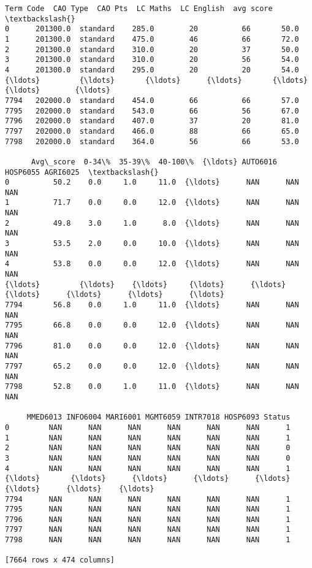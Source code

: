 \documentclass[11pt]{article}
\makeatletter
\newcommand{\boxspacing}{\kern\kvtcb@left@rule\kern\kvtcb@boxsep}
\newcommand{\prompt}[4]{
        \ttfamily\llap{{\color{#2}[#3]:\hspace{3pt}#4}}\vspace{-\baselineskip}
    }
\makeatother
\begin{document}
            \begin{tcolorbox}[breakable, size=fbox, boxrule=.5pt, pad at break*=1mm, opacityfill=0]
\prompt{Out}{outcolor}{22}{\boxspacing}
\begin{Verbatim}[commandchars=\\\{\}]
      Term Code  CAO Type  CAO Pts  LC Maths  LC English  avg score  \textbackslash{}
0      201300.0  standard    285.0        20          66       50.0
1      201300.0  standard    475.0        46          66       72.0
2      201300.0  standard    310.0        20          37       50.0
3      201300.0  standard    310.0        20          56       54.0
4      201300.0  standard    295.0        20          20       54.0
{\ldots}         {\ldots}       {\ldots}      {\ldots}       {\ldots}         {\ldots}        {\ldots}
7794   202000.0  standard    454.0        66          66       57.0
7795   202000.0  standard    543.0        66          56       67.0
7796   202000.0  standard    407.0        37          20       81.0
7797   202000.0  standard    466.0        88          66       65.0
7798   202000.0  standard    364.0        56          66       53.0

      Avg\_score  0-34\%  35-39\%  40-100\%  {\ldots} AUTO6016 HOSP6055 AGRI6025  \textbackslash{}
0          50.2    0.0     1.0     11.0  {\ldots}      NAN      NAN      NAN
1          71.7    0.0     0.0     12.0  {\ldots}      NAN      NAN      NAN
2          49.8    3.0     1.0      8.0  {\ldots}      NAN      NAN      NAN
3          53.5    2.0     0.0     10.0  {\ldots}      NAN      NAN      NAN
4          53.8    0.0     0.0     12.0  {\ldots}      NAN      NAN      NAN
{\ldots}         {\ldots}    {\ldots}     {\ldots}      {\ldots}  {\ldots}      {\ldots}      {\ldots}      {\ldots}
7794       56.8    0.0     1.0     11.0  {\ldots}      NAN      NAN      NAN
7795       66.8    0.0     0.0     12.0  {\ldots}      NAN      NAN      NAN
7796       81.0    0.0     0.0     12.0  {\ldots}      NAN      NAN      NAN
7797       65.2    0.0     0.0     12.0  {\ldots}      NAN      NAN      NAN
7798       52.8    0.0     1.0     11.0  {\ldots}      NAN      NAN      NAN

     MMED6013 INFO6004 MARI6001 MGMT6059 INTR7018 HOSP6093 Status
0         NAN      NAN      NAN      NAN      NAN      NAN      1
1         NAN      NAN      NAN      NAN      NAN      NAN      1
2         NAN      NAN      NAN      NAN      NAN      NAN      0
3         NAN      NAN      NAN      NAN      NAN      NAN      0
4         NAN      NAN      NAN      NAN      NAN      NAN      1
{\ldots}       {\ldots}      {\ldots}      {\ldots}      {\ldots}      {\ldots}      {\ldots}    {\ldots}
7794      NAN      NAN      NAN      NAN      NAN      NAN      1
7795      NAN      NAN      NAN      NAN      NAN      NAN      1
7796      NAN      NAN      NAN      NAN      NAN      NAN      1
7797      NAN      NAN      NAN      NAN      NAN      NAN      1
7798      NAN      NAN      NAN      NAN      NAN      NAN      1

[7664 rows x 474 columns]
\end{Verbatim}
\end{tcolorbox}
        
\end{document}
